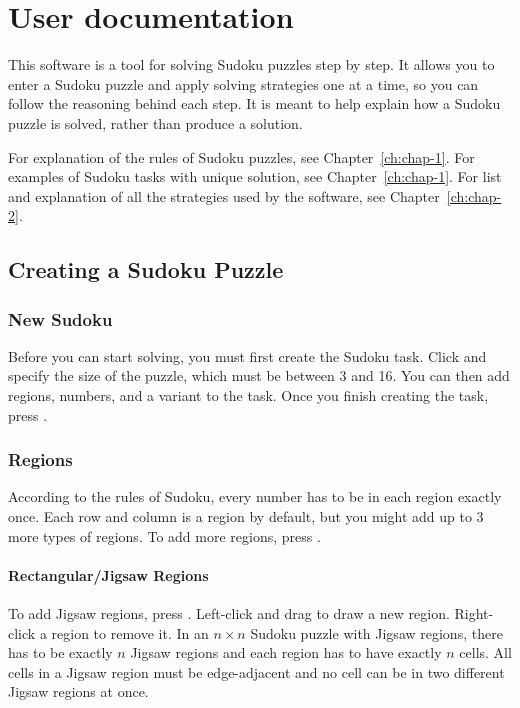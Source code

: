 \chapter{User documentation}\label{ch:b}

This software is a tool for solving Sudoku puzzles step by step.
It allows you to enter a Sudoku puzzle and apply solving strategies one at a time,
so you can follow the reasoning behind each step.
It is meant to help explain how a Sudoku puzzle is solved, rather than produce a solution.

For explanation of the rules of Sudoku puzzles, see Chapter~\ref{ch:chap-1}.
For examples of Sudoku tasks with unique solution, see Chapter~\ref{ch:chap-1}.
For list and explanation of all the strategies used by the software, see Chapter~\ref{ch:chap-2}.

\section{Creating a Sudoku Puzzle}

\subsection*{New Sudoku}

Before you can start solving, you must first create the Sudoku task.
Click  and specify the size of the puzzle, which must be between 3 and 16.
You can then add regions, numbers, and a variant to the task.
Once you finish creating the task, press .


\subsection*{Regions}

According to the rules of Sudoku, every number has to be in each region exactly once.
Each row and column is a region by default, but you might add up to 3 more types of regions.
To add more regions, press .

\subsubsection*{Rectangular/Jigsaw Regions}

To add Jigsaw regions, press .
Left-click and drag to draw a new region.
Right-click a region to remove it.
In an $n \times n$ Sudoku puzzle with Jigsaw regions,
there has to be exactly $n$ Jigsaw regions and each region has to have exactly $n$ cells.
All cells in a Jigsaw region must be edge-adjacent and no cell can be in two different Jigsaw regions at once.

